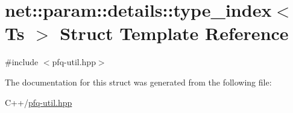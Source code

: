 \hypertarget{structnet_1_1param_1_1details_1_1type__index}{\section{net\-:\-:param\-:\-:details\-:\-:type\-\_\-index$<$ Ts $>$ Struct Template Reference}
\label{structnet_1_1param_1_1details_1_1type__index}
}


{\ttfamily \#include $<$pfq-\/util.\-hpp$>$}



The documentation for this struct was generated from the following file\-:\begin{DoxyCompactItemize}
\item 
C++/\hyperlink{pfq-util_8hpp}{pfq-\/util.\-hpp}\end{DoxyCompactItemize}
